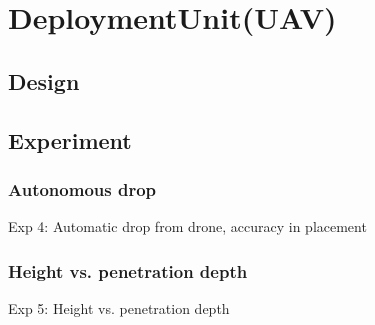 \section{DeploymentUnit(UAV)}\label{sec:DeploymentUnit(UAV)}

\subsection{Design}



\subsection{Experiment}


\subsubsection{Autonomous drop}
Exp 4: Automatic drop from drone, accuracy in placement




\subsubsection{Height vs. penetration depth}
Exp 5: Height vs. penetration depth



